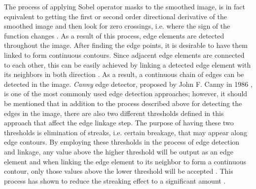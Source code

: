 \documentclass[12pt]{report}
\begin{document}
The process of applying Sobel operator masks to the smoothed image, is in fact equivalent to getting the first or second order directional derivative of the smoothed image 
and then look for zero crossings, i.e. where the sign of
the function changes \cite{sze11}. As a result of this process, edge elements are detected throughout the image.
After finding the edge points, it is desirable to have them linked to form continuous contours. Since adjacent edge elements are connected to each other, this can be easily achieved by linking
a detected edge element with its neighbors in both direction \cite{sze11}. As a result, a continuous chain of edges can be detected in the image.
{\it Canny} edge detector, proposed by John F. Canny in 1986 \cite{canny86}, is one of the most commonly used edge detection approaches; however, it should be mentioned that in addition 
to the process described above for detecting the edges in the image, there are also two different thresholds defined 
in this approach that affect the edge linkage step. The purpose of having these two thresholds is elimination of streaks, i.e. certain breakage, that may appear along edge contours. 
By employing these thresholds in the process of edge detection and linkage, any value above the higher threshold will be output as an edge element and when linking the edge element 
to its neighbor to form a continuous contour, only those 
values above the lower threshold will be accepted \cite{canny86}. This process has shown to reduce the streaking effect to a significant amount \cite{canny86}. \newline
\end{document}
